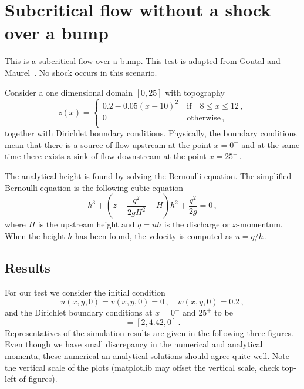 
\section{Subcritical flow without a shock over a bump}

This is a subcritical flow over a bump. This test is adapted from Goutal and Maurel~\cite{GM1997}. No shock occurs in this scenario. 

Consider a one dimensional domain $[0,25]$ with topography
\begin{equation}
z(x)= \left\{ \begin{array}{ll}
 0.2-0.05\left(x-10\right)^2& ~\textrm{if}\quad 8 \leq x \leq 12\,,\\
 0 & ~\textrm{otherwise}\,,\\
\end{array} \right.
\end{equation}
together with Dirichlet boundary conditions.
Physically, the boundary conditions mean that there is a source of flow upstream at the point $x=0^{-}$ and at the same time there exists a sink of flow downstream at the point $x=25^{+}$\,.


The analytical height is found by solving the Bernoulli equation. The simplified Bernoulli equation is the following cubic equation
\begin{equation}
h^3 + \left(z - \frac{q^2}{2 g H^2} - H \right) h^2 + \frac{q^2}{2 g} = 0\,,
\end{equation}
where $H$ is the upstream height and $q=uh$ is the discharge or $x$-momentum. When the height $h$ has been found, the velocity is computed as $u=q/h$\,.

\subsection{Results}
For our test we consider the initial condition
\begin{equation}
u(x,y,0)=v(x,y,0)=0\,, \quad
w(x,y,0)= 0.2\,,
\end{equation}
and the Dirichlet boundary conditions at $x=0^{-}$ and $25^{+}$ to be 
\begin{equation}
[w,hu,hv]=[2, 4.42, 0]\,.
\end{equation}
Representatives of the simulation results are given in the following three figures. Even though we have small discrepancy in the numerical and analytical momenta, these numerical an analytical solutions should agree quite well. Note the vertical scale of the plots (matplotlib may offset the vertical scale, check top-left of figures).

